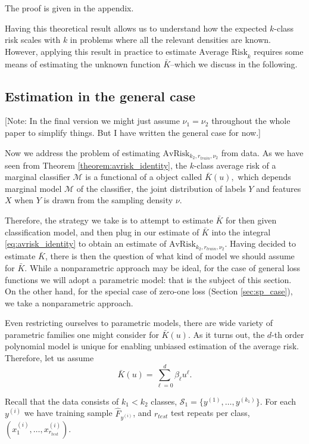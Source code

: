 \documentclass[12pt]{article}
\begin{document}
The proof is given in the appendix.

Having this theoretical result allows us to understand how the
expected $k$-class risk scales with $k$ in problems where all the
relevant densities are known.  However, applying this result in
practice to estimate $\text{Average Risk}_k$ requires some means of
estimating the unknown function $\bar{K}$--which we discuss in the
following.

\subsection{Estimation in the general case}\label{sec:estimation}

[Note: In the final version we might just assume $\nu_1 = \nu_2$
throughout the whole paper to simplify things.  But I have written the
general case for now.]

Now we address the problem of estimating $\text{AvRisk}_{k_2,
r_{train}, \nu_2}$ from data.  As we have seen from
Theorem \eqref{theorem:avrisk_identity}, the $k$-class average risk of
a marginal classifier $\mathcal{M}$ is a functional of a object called
$\bar{K}(u),$ which depends marginal model $\mathcal{M}$ of the
classifier, the joint distribution of labels $Y$ and features $X$ when
$Y$ is drawn from the sampling density $\nu$.

Therefore, the strategy we take is to attempt to estimate $\bar{K}$
for then given classification model, and then plug in our estimate of
$\bar{K}$ into the integral \eqref{eq:avrisk_identity} to obtain an
estimate of $\text{AvRisk}_{k_2, r_{train}, \nu_2}$.  Having decided
to estimate $\bar{K}$, there is then the question of what kind of
model we should assume for $\bar{K}$.  While a nonparametric approach
may be ideal, for the case of general loss functions we will adopt a
parametric model: that is the subject of this section.  On the other
hand, for the special case of zero-one loss (Section \ref{sec:sp_case}), we take a
nonparametric approach.

Even restricting ourselves to parametric models, there are wide
variety of parametric families one might consider for $\bar{K}(u)$.
As it turns out, the $d$-th order polynomial model is unique for
enabling unbiased estimation of the average risk.  Therefore, let us
assume
\[
\bar{K}(u) = \sum_{\ell = 0}^d \beta_\ell u^\ell.
\]

Recall that the data consists of $k_1 < k_2$ classes, $\mathcal{S}_1 =
\{y^{(1)},\hdots, y^{(k_1)}\}$. For each $y^{(i)}$ we have training sample $\hat{F}_{y^{(i)}}$, and
$r_{test}$ test repeats per class, $(x_1^{(i)},\hdots,
x_{r_{test}}^{(i)})$.
\end{document}
